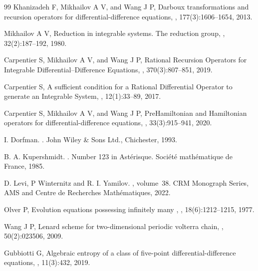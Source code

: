 \documentclass[fleqn,11pt,twoside]{article}
\theoremstyle{definition}
\begin{document}
\begin{thebibliography}{99}
Khanizadeh F, Mikhailov A V, and Wang J P,
\newblock Darboux transformations and recursion operators for
  differential-difference equations,
, 177(3):1606–1654, 2013.

Mikhailov A V,
\newblock Reduction in integrable systems. {T}he reduction group,
,
  32(2):187–192, 1980.

Carpentier S, Mikhailov A V, and Wang J P,
\newblock Rational {R}ecursion {O}perators for {I}ntegrable
  {D}ifferential–{D}ifference {E}quations,
, 370(3):807–851, 2019.

Carpentier S,
\newblock A sufficient condition for a {R}ational {D}ifferential {O}perator to
  generate an {I}ntegrable {S}ystem,
, 12(1):33--89, 2017.

Carpentier S, Mikhailov A V, and Wang J P,
\newblock Pre{H}amiltonian and {H}amiltonian operators for
  differential-difference equations,
, 33(3):915--941, 2020.

I. Dorfman.
.
\newblock John Wiley \& Sons Ltd., Chichester, 1993.

B. A. Kupershmidt.
.
\newblock Number 123 in Ast\'erisque. Soci\'et\'e math\'ematique de France,
  1985.

D. Levi, P Winternitz and R. I. Yamilov.
,
  volume~38.
\newblock CRM Monograph Series, AMS and Centre de Recherches Math\'ematiques,
  2022.

Olver P,
\newblock Evolution equations possessing infinitely many ,
, 18(6):1212--1215, 1977.

Wang J P,
\newblock Lenard scheme for two-dimensional periodic volterra chain,
, 50(2):023506, 2009.

Gubbiotti G,
\newblock Algebraic entropy of a class of five-point differential-difference
  equations,
, 11(3):432, 2019.

\end{thebibliography}

\label{lastpage}
\end{document}
